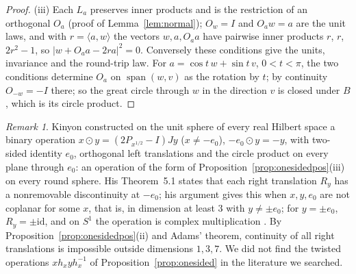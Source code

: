 \documentclass[11pt,reqno]{amsart}
\theoremstyle{definition}
\theoremstyle{remark}
\newtheorem{remark}[theorem]{Remark}
\numberwithin{equation}{section}
\newcommand{\ip}[2]{\langle #1,#2\rangle}
\begin{document}
\begin{proof}
(iii) Each $L_a$ preserves inner products and is the restriction of an orthogonal $O_a$ (proof of Lemma~\ref{lem:normal}); $O_w=I$ and $O_aw=a$ are the
unit laws, and with $r=\ip aw$ the vectors $w,a,O_aa$ have pairwise inner products $r$, $r$, $2r^2-1$, so $\lvert w+O_aa-2ra\rvert^2=0$.  Conversely
these conditions give the units, invariance and the round-trip law.  For $a=\cos t\,w+\sin t\,v$, $0<t<\pi$, the two conditions determine $O_a$
on $\operatorname{span}(w,v)$ as the rotation by $t$; by continuity $O_{-w}=-I$ there; so the great circle through $w$ in the direction $v$ is
closed under $B$, which is its circle product.
\end{proof}

\begin{remark}\label{rem:onesidedlit}
Kinyon \cite{Kinyon00} constructed on the unit sphere of every real Hilbert space a binary operation $x\odot y=(2P_{x^{1/2}}-I)Jy$
($x\ne-e_0$), $-e_0\odot y=-y$, with two-sided identity $e_0$, orthogonal left translations and the circle product on every plane through
$e_0$: an operation of the form of Proposition~\ref{prop:onesidedpos}(iii) on every round sphere.  His Theorem~5.1 states that each right
translation $R_y$ has a nonremovable discontinuity at $-e_0$; his argument \cite[(5.1)--(5.3)]{Kinyon00} gives this when $x,y,e_0$ are not coplanar
for some $x$, that is, in dimension at least $3$ with $y\ne\pm e_0$; for $y=\pm e_0$, $R_y=\pm\mathrm{id}$, and on $S^1$ the operation is complex
multiplication \cite[(3.6)]{Kinyon00}.  By Proposition~\ref{prop:onesidedpos}(ii) and Adams' theorem, continuity of all right translations is
impossible outside dimensions $1,3,7$.  We did not find the twisted operations $xh_xyh_x^{-1}$ of
Proposition~\ref{prop:onesided} in the literature we searched.
\end{remark}
\end{document}
